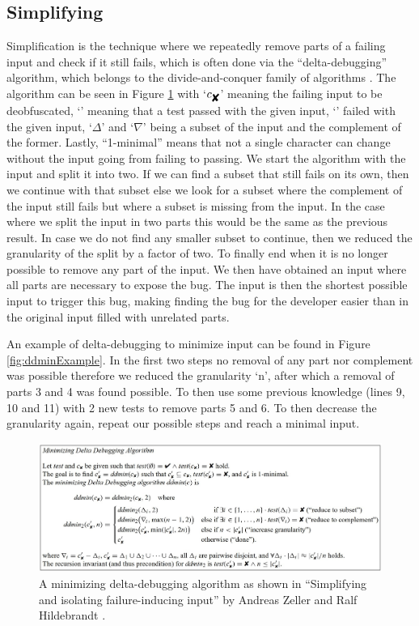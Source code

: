\subsection{Simplifying}
\label{inputReduction:Simplifying}
Simplification is the technique where we repeatedly remove parts of a failing input and check if it still fails, which is often done via the “delta-debugging” algorithm, which belongs to the divide-and-conquer family of algorithms \cite{2FuzzingAndDeltaDebuggingSMTSolvers}. 
The algorithm can be seen in Figure \ref{fig:ddmin} with 
‘$ c_{\mbox{\ding{56}}} $’  %
meaning the failing input to be deobfuscated,
‘’ %
meaning that a test passed with the given input,
‘’ %
failed with the given input, 
‘$\Delta$’ and ‘$\nabla$’ being a subset of the input and the complement of the former.
Lastly, “1-minimal” means that not a single character can change without the input going from failing to passing. 
We start the algorithm with the input and split it into two. If we can find a subset that still fails on its own, then we continue with that subset else we look for a subset where the complement of the input still fails but where a subset is missing from the input. In the case where we split the input in two parts this would be the same as the previous result. In case we do not find any smaller subset to continue, then we reduced the granularity of the split by a factor of two. To finally end when it is no longer possible to remove any part of the input. We then have obtained an input where all parts are necessary to expose the bug. The input is then the shortest possible input to trigger this bug, making finding the bug for the developer easier than in the original input filled with unrelated parts. 

An example of delta-debugging to minimize input can be found in Figure \ref{fig:ddminExample}. In the first two steps no removal of any part nor complement was possible therefore we reduced the granularity ‘n’, after which a removal of parts 3 and 4 was found possible. To then use some previous knowledge (lines 9, 10 and 11) with 2 new tests to remove parts 5 and 6. To then decrease the granularity again, repeat our possible steps and reach a minimal input.

\begin{figure}
	\centering
	\includegraphics[width=1.0\textwidth]{images/ddminFromPaper5edit}
	\caption{A minimizing delta-debugging algorithm as shown in “Simplifying and isolating failure-inducing input” by Andreas Zeller and Ralf Hildebrandt \cite{5zeller2002simplifyingIsolatingFailure-inducing}.}
	\label{fig:ddmin}
\end{figure}


